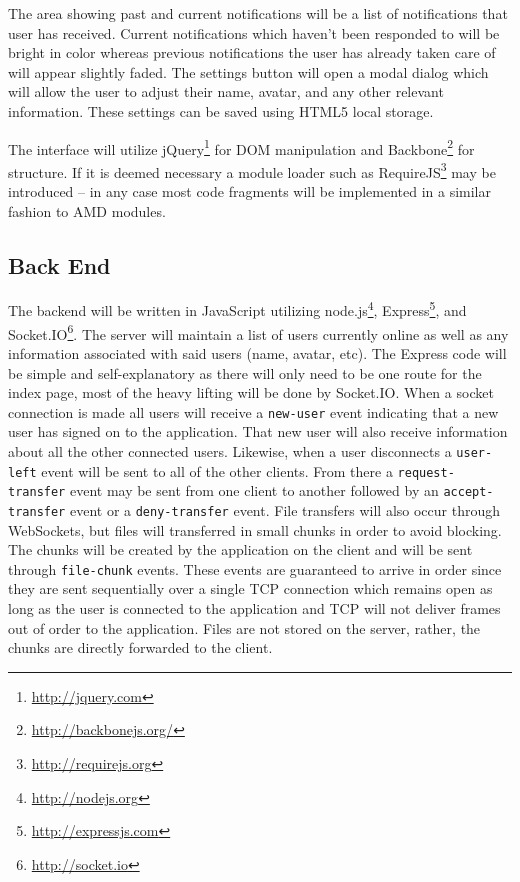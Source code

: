 \documentclass[letterpaper, 10pt]{article}
\begin{document}
	The area showing past and current notifications will be a list of notifications that user has received. Current notifications which haven't been responded to will be bright in color whereas previous notifications the user has already taken care of will appear slightly faded. The settings button will open a modal dialog which will allow the user to adjust their name, avatar, and any other relevant information. These settings can be saved using HTML5 local storage.

	The interface will utilize jQuery\footnote{\url{http://jquery.com}} for DOM manipulation and Backbone\footnote{\url{http://backbonejs.org/}} for structure. If it is deemed necessary a module loader such as RequireJS\footnote{\url{http://requirejs.org}} may be introduced -- in any case most code fragments will be implemented in a similar fashion to AMD modules.

	\subsection{Back End}
	The backend will be written in JavaScript utilizing node.js\footnote{\url{http://nodejs.org}}, Express\footnote{\url{http://expressjs.com}}, and Socket.IO\footnote{\url{http://socket.io}}. The server will maintain a list of users currently online as well as any information associated with said users (name, avatar, etc). The Express code will be simple and self-explanatory as there will only need to be one route for the index page, most of the heavy lifting will be done by Socket.IO. When a socket connection is made all users will receive a \texttt{new-user} event indicating that a new user has signed on to the application. That new user will also receive information about all the other connected users. Likewise, when a user disconnects a \texttt{user-left} event will be sent to all of the other clients. From there a \texttt{request-transfer} event may be sent from one client to another followed by an \texttt{accept-transfer} event or a \texttt{deny-transfer} event. File transfers will also occur through WebSockets, but files will transferred in small chunks in order to avoid blocking. The chunks will be created by the application on the client and will be sent through \texttt{file-chunk} events. These events are guaranteed to arrive in order since they are sent sequentially over a single TCP connection which remains open as long as the user is connected to the application and TCP will not deliver frames out of order to the application. Files are not stored on the server, rather, the chunks are directly forwarded to the client.
\end{document}

